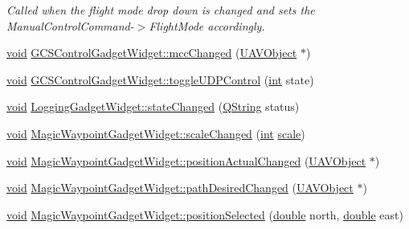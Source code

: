 \begin{DoxyCompactItemize}
\begin{DoxyCompactList}\small\item\em Called when the flight mode drop down is changed and sets the Manual\-Control\-Command-\/$>$Flight\-Mode accordingly. \end{DoxyCompactList}\item 
\hyperlink{group___u_a_v_objects_plugin_ga444cf2ff3f0ecbe028adce838d373f5c}{void} \hyperlink{group___g_c_s_control_gadget_plugin_gabdcd9baf431d953b9e2c5f8f2c3d485c}{G\-C\-S\-Control\-Gadget\-Widget\-::mcc\-Changed} (\hyperlink{class_u_a_v_object}{U\-A\-V\-Object} $\ast$)
\item 
\hyperlink{group___u_a_v_objects_plugin_ga444cf2ff3f0ecbe028adce838d373f5c}{void} \hyperlink{group___g_c_s_control_gadget_plugin_gaaaa6db9417f6f94567e477ed6b5bd099}{G\-C\-S\-Control\-Gadget\-Widget\-::toggle\-U\-D\-P\-Control} (\hyperlink{ioapi_8h_a787fa3cf048117ba7123753c1e74fcd6}{int} state)
\item 
\hyperlink{group___u_a_v_objects_plugin_ga444cf2ff3f0ecbe028adce838d373f5c}{void} \hyperlink{group___g_c_s_control_gadget_plugin_ga8d9370f949bfe6eec4f37676feb6de85}{Logging\-Gadget\-Widget\-::state\-Changed} (\hyperlink{group___u_a_v_objects_plugin_gab9d252f49c333c94a72f97ce3105a32d}{Q\-String} status)
\item 
\hyperlink{group___u_a_v_objects_plugin_ga444cf2ff3f0ecbe028adce838d373f5c}{void} \hyperlink{group___g_c_s_control_gadget_plugin_ga9cebbe1d3a653c8385f5fdc70345efd6}{Magic\-Waypoint\-Gadget\-Widget\-::scale\-Changed} (\hyperlink{ioapi_8h_a787fa3cf048117ba7123753c1e74fcd6}{int} \hyperlink{glext_8h_a281421b881aa7a1266842b73a3bc7655}{scale})
\item 
\hyperlink{group___u_a_v_objects_plugin_ga444cf2ff3f0ecbe028adce838d373f5c}{void} \hyperlink{group___g_c_s_control_gadget_plugin_gaa10cdac61400db1034c7954b3c549824}{Magic\-Waypoint\-Gadget\-Widget\-::position\-Actual\-Changed} (\hyperlink{class_u_a_v_object}{U\-A\-V\-Object} $\ast$)
\item 
\hyperlink{group___u_a_v_objects_plugin_ga444cf2ff3f0ecbe028adce838d373f5c}{void} \hyperlink{group___g_c_s_control_gadget_plugin_ga3270e904f313cabdad8a5048009ceb25}{Magic\-Waypoint\-Gadget\-Widget\-::path\-Desired\-Changed} (\hyperlink{class_u_a_v_object}{U\-A\-V\-Object} $\ast$)
\item 
\hyperlink{group___u_a_v_objects_plugin_ga444cf2ff3f0ecbe028adce838d373f5c}{void} \hyperlink{group___g_c_s_control_gadget_plugin_ga8735baaf13101dbe0dafb3dc84d83efd}{Magic\-Waypoint\-Gadget\-Widget\-::position\-Selected} (\hyperlink{_super_l_u_support_8h_a8956b2b9f49bf918deed98379d159ca7}{double} north, \hyperlink{_super_l_u_support_8h_a8956b2b9f49bf918deed98379d159ca7}{double} east)
\end{DoxyCompactItemize}


